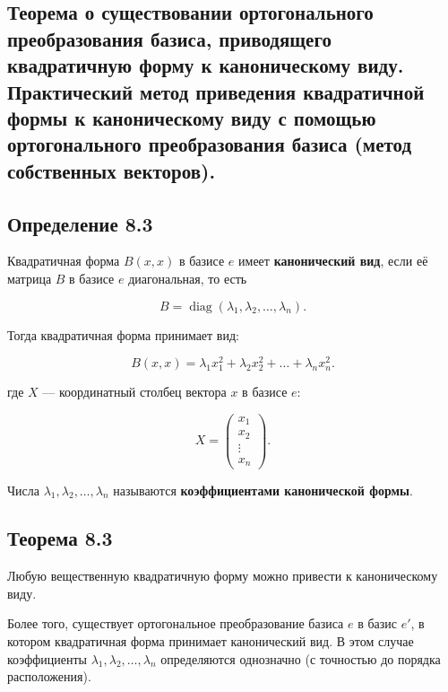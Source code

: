{
\subsection{Теорема о существовании ортогонального преобразования базиса, приводящего квадратичную форму к каноническому виду. Практический метод приведения квадратичной формы к каноническому виду с помощью ортогонального преобразования базиса (метод собственных векторов).}

\subsection*{Определение 8.3}

Квадратичная форма \( B(x, x) \) в базисе \( e \) имеет \textbf{канонический вид}, если её матрица \( B \) в базисе \( e \) диагональная, то есть



\[
B = \operatorname{diag}(\lambda_1, \lambda_2, \ldots, \lambda_n).
\]



Тогда квадратичная форма принимает вид:



\[
B(x, x) = \lambda_1 x_1^2 + \lambda_2 x_2^2 + \ldots + \lambda_n x_n^2.
\]



где \( X \) — координатный столбец вектора \( x \) в базисе \( e \):



\[
X = \begin{pmatrix}
x_1 \\
x_2 \\
\vdots \\
x_n
\end{pmatrix}.
\]



Числа \( \lambda_1, \lambda_2, \ldots, \lambda_n \) называются \textbf{коэффициентами канонической формы}.

\subsection*{Теорема 8.3}

Любую вещественную квадратичную форму можно привести к каноническому виду. 

Более того, существует ортогональное преобразование базиса \( e \) в базис \( e' \), в котором квадратичная форма принимает канонический вид. В этом случае коэффициенты \( \lambda_1, \lambda_2, \dots, \lambda_n \) определяются однозначно (с точностью до порядка расположения).

}
